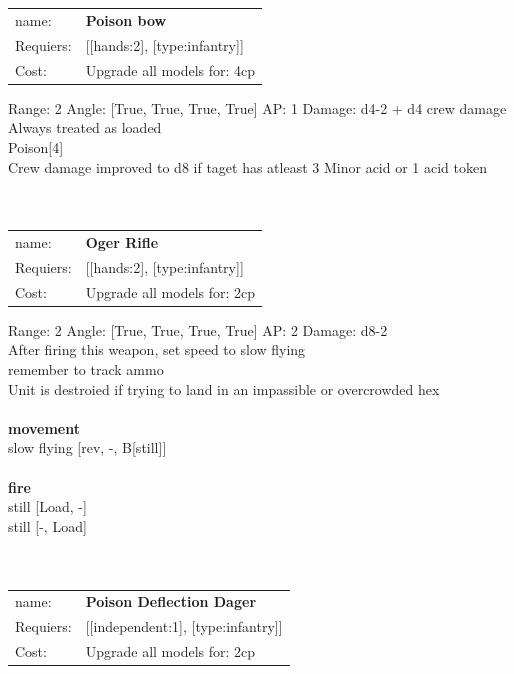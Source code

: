 \ \\
\ \\
\begin{tabular}{ll}
name: & {\bf Poison bow } \\
Requiers: & [[hands:2], [type:infantry]] \\
Cost: & Upgrade all models for: 4cp \\
\end{tabular}



Range: 2  Angle: [True, True, True, True] AP: 1 Damage: d4-2 + d4 crew damage \\
Always treated as loaded\\ 
Poison[4]\\ 
Crew damage improved to d8 if taget has atleast 3 Minor acid or 1 acid token\\ 








\ \\
\ \\
\begin{tabular}{ll}
name: & {\bf Oger Rifle } \\
Requiers: & [[hands:2], [type:infantry]] \\
Cost: & Upgrade all models for: 2cp \\
\end{tabular}



Range: 2  Angle: [True, True, True, True] AP: 2 Damage: d8-2 \\
After firing this weapon, set speed to slow flying\\ 
remember to track ammo\\ 
Unit is destroied if trying to land in an impassible or overcrowded hex\\ 







\ \\ {\bf movement } \\
slow flying [rev, -, B[still]] \\
\ \\ {\bf fire } \\
still [Load, -] \\
still [-, Load] \\

\ \\
\ \\
\begin{tabular}{ll}
name: & {\bf Poison Deflection Dager } \\
Requiers: & [[independent:1], [type:infantry]] \\
Cost: & Upgrade all models for: 2cp \\
\end{tabular}





